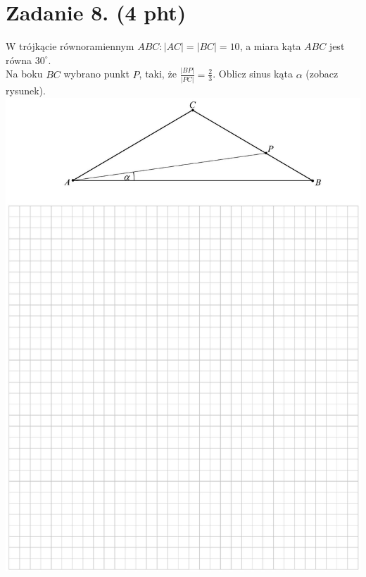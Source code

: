 \documentclass[10pt]{article}
\begin{document}
\section*{Zadanie 8. (4 pht)}
W trójkącie równoramiennym \(A B C:|A C|=|B C|=10\), a miara kąta \(A B C\) jest równa \(30^{\circ}\).\\
Na boku \(B C\) wybrano punkt \(P\), taki, że \(\frac{|B P|}{|P C|}=\frac{2}{3}\). Oblicz sinus kąta \(\alpha\) (zobacz rysunek).\\
\includegraphics[max width=\textwidth, center]{2024_11_21_ebf83f11df6f4915f701g-12}\\
\end{document}
